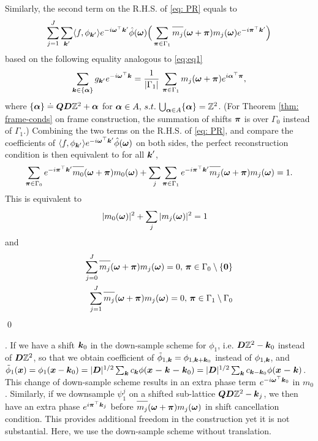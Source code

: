 Similarly, the second term on the R.H.S. of \eqref{eq: PR} equals to 
\begin{align*}
\sum_{j=1}^J\sum_{\V{k}'}\langle f,\phi_{\V{k}'}\rangle e^{-i\V{\omega}^\top \V{k}'}\hat{\phi}(\V{\omega})\Big(\sum_{\V{\pi}\in\Gamma_1} \overlinespace{m_j}(\V{\omega}+\V{\pi})m_j(\V{\omega})e^{-i\V{\pi}^\top\V{k}'} \Big)
\end{align*}
based on the following equality analogous to \eqref{eq:eq1}
\begin{align}
\sum_{\boldsymbol{k}\in\{\boldsymbol{\alpha}\}} g_{\boldsymbol{k}'} e^{-i\boldsymbol{\omega}^\top\boldsymbol{k}} = \frac{1}{|\Gamma_1|}\, \sum_{\boldsymbol{\pi}\in\Gamma_1} m_j(\boldsymbol{\omega} + \boldsymbol{\pi})e^{i\boldsymbol{\alpha}^\top\boldsymbol{\pi}},
\end{align}
where $\{\boldsymbol{\alpha}\} \doteq \boldsymbol{QD}\mathbb{Z}^2 + \boldsymbol{\alpha}$ for $\boldsymbol{\alpha}\in A,\, s.t.\, \bigcup_{\boldsymbol{\alpha}\in A} \{\boldsymbol{\alpha}\} = \mathbb{Z}^2$.
(For Theorem \ref{thm: frame-conds} on frame construction, the summation of shifts $\boldsymbol{\pi}$ is over $\Gamma_0$ instead of $\Gamma_1$.) 
Combining the two terms on the R.H.S. of \eqref{eq: PR}, and compare the coefficients of $\langle f,\phi_{\boldsymbol{k}'}\rangle e^{-i\boldsymbol{\omega}^\top \boldsymbol{k}'}\hat{\phi}(\boldsymbol{\omega})$ on both sides, the perfect reconstruction condition is then equivalent to for all $\boldsymbol{k}'$,
\begin{align*}
\sum_{\V{\pi}\in\Gamma_0}e^{-i\V{\pi}^\top\V{k}'}\overlinespace{m_0}(\V{\omega}+\V{\pi})m_0(\V{\omega}) + \sum_j\sum_{\V{\pi}\in\Gamma_1} e^{-i\V{\pi}^\top\V{k}'}\overlinespace{m_j}(\V{\omega}+\V{\pi})m_j(\V{\omega}) = 1. 
\end{align*} 
This is equivalent to 
\begin{align*}
&|m_0(\boldsymbol{\omega})|^2 + \sum_j|m_j(\boldsymbol{\omega})|^2 = 1
\end{align*}
and
\begin{align*}
\sum_{j=0}^J\overlinespace{m_j}(\V{\omega}+\V{\pi})m_j(\V{\omega}) = 0, 
\,\V{\pi}\in \Gamma_0\setminus\{\V{0}\}\\
\sum_{j=1}^J\overlinespace{m_j}(\V{\omega}+\V{\pi})m_j(\V{\omega}) = 0,\,\V{\pi}\in \Gamma_1\setminus \Gamma_0
\end{align*}
\qed

.
If we have a shift $\boldsymbol{k}_0$ in the down-sample scheme for $\phi_1$, i.e. $\boldsymbol{D}\mathbb{Z}^2 - \boldsymbol{k}_0$ instead of $\boldsymbol{D}\mathbb{Z}^2$, so that we obtain coefficient of $\tilde{\phi}_{1,\boldsymbol{k}} = \phi_{1,\boldsymbol{k}+\boldsymbol{k}_0}$ instead of $\phi_{1,\boldsymbol{k}}$, and $\tilde{\phi}_1(\boldsymbol{x}) =\phi_1(\boldsymbol{x}-\boldsymbol{k}_0)= |\boldsymbol{D}|^{1/2}\sum_{\boldsymbol{k}}c_{\boldsymbol{k}}\phi(\boldsymbol{x-k-k}_0) = |\boldsymbol{D}|^{1/2}\sum_{\boldsymbol{k}}c_{\boldsymbol{k}-\boldsymbol{k}_0}\phi(\boldsymbol{x-k})$. This change of down-sample scheme results in an extra phase term $e^{-i\boldsymbol{\omega}^\top \boldsymbol{k}_0}$ in $m_0$. 
Similarly, if we downsample $\psi_1^j$ on a shifted sub-lattice $\boldsymbol{QD}\mathbb{Z}^2-\boldsymbol{k}_j$, we then have an extra phase $e^{i\boldsymbol{\pi}^\top\boldsymbol{k}_j}$ before $\overlinespace{m_j}(\V{\omega}+\V{\pi})m_j(\V{\omega})$ in shift cancellation condition. This provides additional freedom in the construction yet it is not substantial. Here, we use the down-sample scheme without translation.
